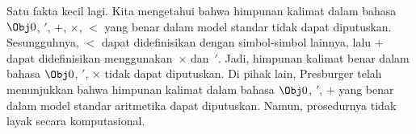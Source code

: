 \documentclass[../../../include/open-logic-section]{subfiles}
\begin{document}
Satu fakta kecil lagi. Kita mengetahui bahwa himpunan kalimat dalam bahasa
$\Obj 0$, $'$, $+$, $\times$, $<$ yang benar dalam model standar tidak dapat
diputuskan. Sesungguhnya, $<$ dapat didefinisikan dengan simbol-simbol
lainnya, lalu $+$ dapat didefinisikan menggunakan~$\times$ dan~$'$. Jadi,
himpunan kalimat benar dalam bahasa $\Obj 0$, $'$, $\times$ tidak dapat
diputuskan. Di pihak lain, Presburger telah menunjukkan bahwa himpunan
kalimat dalam bahasa $\Obj 0$, $'$, $+$ yang benar dalam model standar
aritmetika dapat diputuskan. Namun, prosedurnya tidak layak secara
komputasional.
\end{document}
